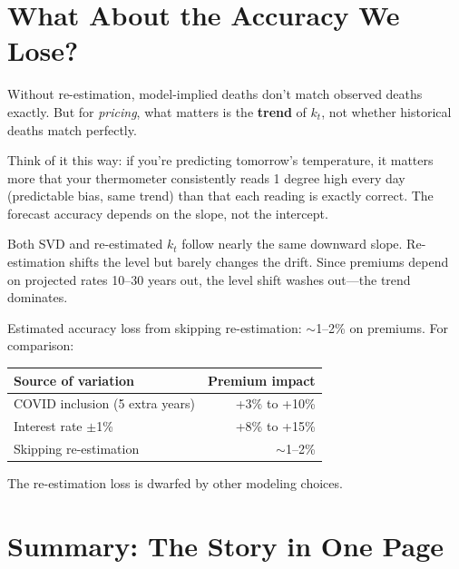 \documentclass[11pt, a4paper]{article}
\newcommand{\kt}{k_t}
\begin{document}
\section{What About the Accuracy We Lose?}

\begin{intuition}
Without re-estimation, model-implied deaths don't match observed deaths
exactly. But for \emph{pricing}, what matters is the \textbf{trend}
of $\kt$, not whether historical deaths match perfectly.

\medskip
Think of it this way: if you're predicting tomorrow's temperature,
it matters more that your thermometer consistently reads 1 degree
high every day (predictable bias, same trend) than that each reading
is exactly correct. The forecast accuracy depends on the slope,
not the intercept.

\medskip
Both SVD and re-estimated $\kt$ follow nearly the same downward
slope. Re-estimation shifts the level but barely changes the
drift. Since premiums depend on projected rates 10--30 years
out, the level shift washes out---the trend dominates.
\end{intuition}

\begin{application}
Estimated accuracy loss from skipping re-estimation: $\sim$1--2\% on
premiums. For comparison:
\begin{center}
\begin{tabular}{lr}
\toprule
\textbf{Source of variation} & \textbf{Premium impact} \\
\midrule
COVID inclusion (5 extra years) & +3\% to +10\% \\
Interest rate $\pm$1\% & +8\% to +15\% \\
Skipping re-estimation & $\sim$1--2\% \\
\bottomrule
\end{tabular}
\end{center}
The re-estimation loss is dwarfed by other modeling choices.
\end{application}


\section{Summary: The Story in One Page}
\end{document}
